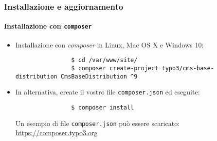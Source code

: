 \begin{frame}[fragile]
	\frametitle{Installazione e aggiornamento}
	\framesubtitle{Installazione con \texttt{composer}}

	\lstset{basicstyle=\tiny\ttfamily}

	\begin{itemize}
		\item Installazione con \textit{composer} in Linux, Mac OS X e Windows 10:

			\begin{lstlisting}
				$ cd /var/www/site/
				$ composer create-project typo3/cms-base-distribution CmsBaseDistribution ^9
			\end{lstlisting}

		\item In alternativa, create il vostro file \texttt{composer.json} ed eseguite:

			\begin{lstlisting}
				$ composer install
			\end{lstlisting}

			Un esempio di file \texttt{composer.json} può essere scaricato:\newline
			\smaller
				\href{https://composer.typo3.org}{https://composer.typo3.org}
			\normalsize

	\end{itemize}
\end{frame}

